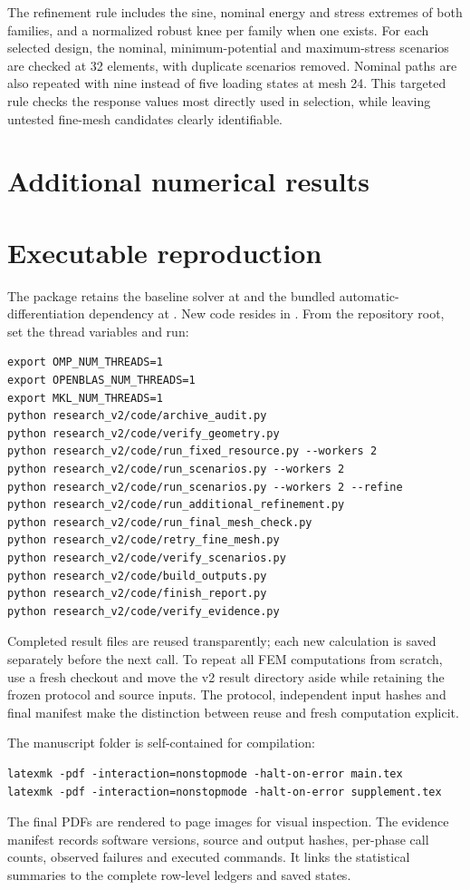 \documentclass[11pt]{article}
\begin{document}
The refinement rule includes the sine, nominal energy and stress extremes of both families, and a normalized robust knee per family when one exists. For each selected design, the nominal, minimum-potential and maximum-stress scenarios are checked at 32 elements, with duplicate scenarios removed. Nominal paths are also repeated with nine instead of five loading states at mesh 24. This targeted rule checks the response values most directly used in selection, while leaving untested fine-mesh candidates clearly identifiable.

\section{Additional numerical results}


\section{Executable reproduction}
The package retains the baseline solver at  and the bundled automatic-differentiation dependency at . New code resides in . From the repository root, set the thread variables and run:
\begin{verbatim}
export OMP_NUM_THREADS=1
export OPENBLAS_NUM_THREADS=1
export MKL_NUM_THREADS=1
python research_v2/code/archive_audit.py
python research_v2/code/verify_geometry.py
python research_v2/code/run_fixed_resource.py --workers 2
python research_v2/code/run_scenarios.py --workers 2
python research_v2/code/run_scenarios.py --workers 2 --refine
python research_v2/code/run_additional_refinement.py
python research_v2/code/run_final_mesh_check.py
python research_v2/code/retry_fine_mesh.py
python research_v2/code/verify_scenarios.py
python research_v2/code/build_outputs.py
python research_v2/code/finish_report.py
python research_v2/code/verify_evidence.py
\end{verbatim}
Completed result files are reused transparently; each new calculation is saved separately before the next call. To repeat all FEM computations from scratch, use a fresh checkout and move the v2 result directory aside while retaining the frozen protocol and source inputs. The protocol, independent input hashes and final manifest make the distinction between reuse and fresh computation explicit.

The manuscript folder is self-contained for compilation:
\begin{verbatim}
latexmk -pdf -interaction=nonstopmode -halt-on-error main.tex
latexmk -pdf -interaction=nonstopmode -halt-on-error supplement.tex
\end{verbatim}
The final PDFs are rendered to page images for visual inspection. The evidence manifest records software versions, source and output hashes, per-phase call counts, observed failures and executed commands. It links the statistical summaries to the complete row-level ledgers and saved states.
\end{document}
